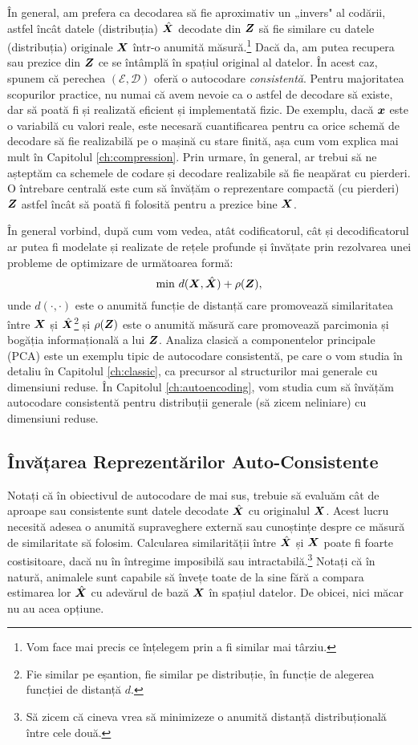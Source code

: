 \documentclass[../../book-main_ro.tex]{subfiles}
\begin{document}
În general, am prefera ca decodarea să fie aproximativ un „invers" al codării, astfel încât datele (distribuția) $\hat {\bm{X}}$ decodate din $\bm{Z}$ să fie similare cu datele (distribuția) originale $\bm{X}$ într-o anumită măsură.\footnote{Vom face mai precis ce înțelegem prin a fi similar mai târziu.} Dacă da, am putea recupera sau prezice din $\bm{Z}$ ce se întâmplă în spațiul original al datelor. În acest caz, spunem că perechea $(\mathcal{E}, \mathcal{D})$ oferă o autocodare {\em consistentă}. Pentru majoritatea scopurilor practice, nu numai că avem nevoie ca o astfel de decodare să existe, dar să poată fi și realizată eficient și implementată fizic. De exemplu, dacă $\bm{x}$ este o variabilă cu valori reale, este necesară cuantificarea pentru ca orice schemă de decodare să fie realizabilă pe o mașină cu stare finită, așa cum vom explica mai mult în Capitolul \ref{ch:compression}. Prin urmare, în general, ar trebui să ne așteptăm ca schemele de codare și decodare realizabile să fie neapărat cu pierderi. O întrebare centrală este cum să învățăm o reprezentare compactă (cu pierderi) $\bm{Z}$ astfel încât să poată fi folosită pentru a prezice bine $\bm{X}$.

În general vorbind, după cum vom vedea, atât codificatorul, cât și decodificatorul ar putea fi modelate și realizate de rețele profunde și învățate prin rezolvarea unei probleme de optimizare de următoarea formă:
\begin{equation}
   \min \, d( \bm{X}, \hat {\bm{X}}) + \rho(\bm{Z}),
   \label{eqn:auto-encoding-objective}
\end{equation}
unde $d(\cdot, \cdot)$ este o anumită funcție de distanță care promovează similaritatea între $\bm{X}$ și $\hat {\bm{X}}$\footnote{Fie similar pe eșantion, fie similar pe distribuție, în funcție de alegerea funcției de distanță $d$.} și $\rho(\bm{Z})$ este o anumită măsură care promovează parcimonia și bogăția informațională a lui $\bm{Z}$. Analiza clasică a componentelor principale (PCA) \cite{JolliffeI2002} este un exemplu tipic de autocodare consistentă, pe care o vom studia în detaliu în Capitolul \ref{ch:classic}, ca precursor al structurilor mai generale cu dimensiuni reduse. În Capitolul \ref{ch:autoencoding}, vom studia cum să învățăm autocodare consistentă pentru distribuții generale (să zicem neliniare) cu dimensiuni reduse.


\subsection{Învățarea Reprezentărilor Auto-Consistente}
Notați că în obiectivul de autocodare de mai sus, trebuie să evaluăm cât de aproape sau consistente sunt datele decodate $\hat {\bm{X}}$ cu originalul $\bm{X}$. Acest lucru necesită adesea o anumită supraveghere externă sau cunoștințe despre ce măsură de similaritate să folosim. Calcularea similarității între $\hat {\bm{X}}$ și $\bm{X}$ poate fi foarte costisitoare, dacă nu în întregime imposibilă sau intractabilă.\footnote{Să zicem că cineva vrea să minimizeze o anumită distanță distribuțională între cele două.} Notați că în natură, animalele sunt capabile să învețe toate de la sine fără a compara estimarea lor $\hat {\bm{X}}$ cu adevărul de bază $\bm{X}$ în spațiul datelor. De obicei, nici măcar nu au acea opțiune.
\end{document}
